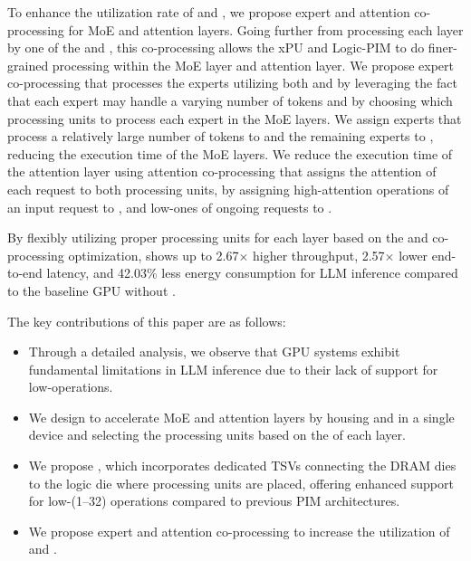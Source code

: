 To enhance the utilization rate of \highp and \lowp, we propose expert and attention co-processing for MoE and attention layers.
Going further from processing each layer by one of the \highp and \lowp, this co-processing allows the xPU and Logic-PIM to do finer-grained processing within the MoE layer and attention layer.
We propose expert co-processing that processes the experts utilizing both \highp and \lowp by leveraging the fact that each expert may handle a varying number of tokens and by choosing which processing units to process each expert in the MoE layers.
We assign experts that process a relatively large number of tokens to \highp and the remaining experts to \lowp, reducing the execution time of the MoE layers.
We reduce the execution time of the attention layer using attention co-processing that assigns the attention of each request to both processing units, by assigning high-\opb attention operations of an input request to \highp, and low-\opb ones of ongoing requests to \lowp.

By flexibly utilizing proper processing units for each layer based on the \opb and co-processing optimization, \duplex shows up to 2.67$\times$ higher throughput, 2.57$\times$ lower end-to-end latency, and 42.03\% less energy consumption for LLM inference compared to the baseline GPU without \lowp.

The key contributions of this paper are as follows:
\begin{itemize}[leftmargin=*,nolistsep]
\item Through a detailed analysis, we observe that GPU systems exhibit fundamental limitations in LLM inference due to their lack of support for low-\opb operations.


\item We design \duplex to accelerate MoE and attention layers by housing \highp and \lowp in a single device and selecting the processing units based on the \opb of each layer.

\item We propose \lowp, which incorporates dedicated TSVs connecting the DRAM dies to the logic die where processing units are placed, offering enhanced support for low-\opb (1--32) operations compared to previous PIM architectures.


\item We propose expert and attention co-processing to increase the utilization of \highp and \lowp.
\end{itemize}

